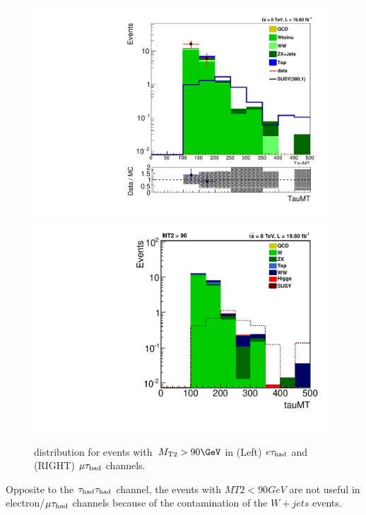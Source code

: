 \begin{figure}[htbp]
\centering
\includegraphics[angle=0,scale=0.35]{SelectionEleTau/TauMT.pdf}
\includegraphics[angle=0,scale=0.35]{SelectionMuTau/tauMT_MuTau.pdf}
\caption{\tauMT distribution for events with $\mttwo>90\GeV$ in (Left) $e\tau_{\rm had}$ and (RIGHT) $\mu\tau_{\rm had}$ channels.}
\label{fig:taumtleptontau}
\end{figure}

Opposite to the $\tau_{\rm had}\tau_{\rm had}$ channel, the events with $MT2<90 GeV$ are not useful in electron/$\mu\tau_{\rm had}$ channels because of the contamination of the $W+jets$ events.











